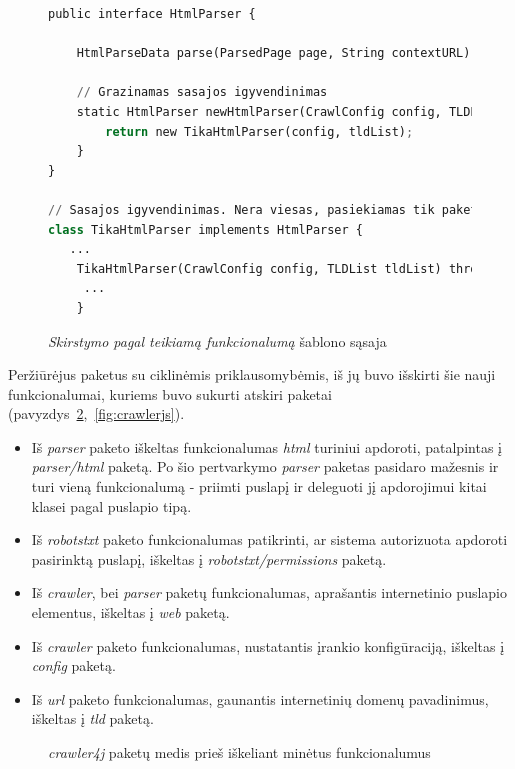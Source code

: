 \begin{figure}[H]
    \begin{lstlisting}[language=Python]
public interface HtmlParser {

    HtmlParseData parse(ParsedPage page, String contextURL) throws ParseException;

    // Grazinamas sasajos igyvendinimas
    static HtmlParser newHtmlParser(CrawlConfig config, TLDList tldList) throws InstantiationException, IllegalAccessException {
        return new TikaHtmlParser(config, tldList);
    }
}

// Sasajos igyvendinimas. Nera viesas, pasiekiamas tik paketo viduje, nes klase ir konstruktorius nenaudoja public raktazodziu
class TikaHtmlParser implements HtmlParser {
   ...
    TikaHtmlParser(CrawlConfig config, TLDList tldList) throws InstantiationException, IllegalAccessException {
     ...
    }
    \end{lstlisting}
    \caption{\textit{Skirstymo pagal teikiamą funkcionalumą} šablono sąsaja}
    \label{fig:sasaja}
\end{figure}
Peržiūrėjus paketus su ciklinėmis priklausomybėmis, iš jų buvo išskirti šie nauji funkcionalumai, kuriems
buvo sukurti atskiri paketai (pavyzdys~\ref{fig:crawlerj},~\ref{fig:crawlerjs}).
\begin{itemize}
    \item Iš \textit{parser} paketo iškeltas funkcionalumas \textit{html} turiniui apdoroti, patalpintas į \textit{parser/html} paketą.
    Po šio pertvarkymo \textit{parser} paketas pasidaro mažesnis ir turi vieną funkcionalumą - priimti puslapį ir deleguoti jį apdorojimui kitai klasei pagal puslapio tipą.
    \item Iš \textit{robotstxt} paketo funkcionalumas patikrinti, ar sistema autorizuota apdoroti pasirinktą puslapį, iškeltas į \textit{robotstxt/permissions} paketą.
    \item Iš \textit{crawler}, bei \textit{parser} paketų funkcionalumas, aprašantis internetinio puslapio elementus, iškeltas į \textit{web} paketą.
    \item Iš \textit{crawler} paketo funkcionalumas, nustatantis įrankio konfigūraciją, iškeltas į \textit{config} paketą.
    \item Iš \textit{url} paketo funkcionalumas, gaunantis internetinių domenų pavadinimus, iškeltas į \textit{tld} paketą.
\end{itemize}

\begin{figure}[H]
    \snugshade
    \endsnugshade
    \caption{\textit{crawler4j} paketų medis prieš iškeliant minėtus funkcionalumus}
    \label{fig:crawlerj}
\end{figure}

